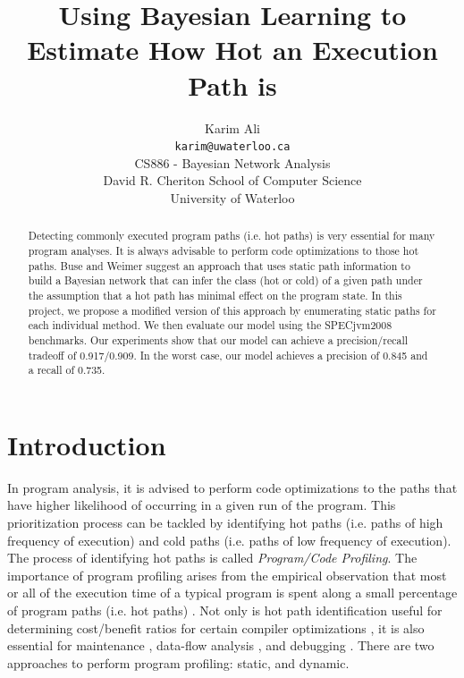\documentclass[10pt,twocolumn,letterpaper]{article}
\begin{document}
\title{Using Bayesian Learning to Estimate How Hot an Execution Path is}

\author{Karim Ali\\
{\tt\small karim@uwaterloo.ca}\\
CS886 - Bayesian Network Analysis\\
David R. Cheriton School of Computer Science\\
University of Waterloo\\}

\maketitle
\thispagestyle{empty}

\begin{abstract}
Detecting commonly executed program paths (i.e. hot paths) is very essential for many program analyses. It is always advisable to perform code optimizations
to those hot paths. Buse and Weimer \cite{buse2009road} suggest an approach that uses static path information to build a Bayesian network that can infer the
class (hot or cold) of a given path under the assumption that a hot path has minimal effect on the program state. In this project, we propose a modified version
of this approach by enumerating static paths for each individual method. We then evaluate our model using the SPECjvm2008 \cite{specjvm2008} benchmarks. Our
experiments show that our model can achieve a precision/recall tradeoff of 0.917/0.909. In the worst case, our model achieves a precision of 0.845 and a recall
of 0.735.
\end{abstract}

\section{Introduction}
\label{sec:intro}
In program analysis, it is advised to perform code optimizations to the paths that have higher likelihood of occurring in a given run of the program. This
prioritization process can be tackled by identifying hot paths (i.e. paths of high frequency of execution) and cold paths (i.e. paths of low frequency of
execution). The process of identifying hot paths is called \textit{Program/Code Profiling}. The importance of program profiling arises from the empirical
observation that most or all of the execution time of a typical program is spent along a small percentage of program paths (i.e. hot paths) \cite{buse2009road}.
Not only is hot path identification useful for determining cost/benefit ratios for certain compiler optimizations \cite{boogerd2008use}, it is also essential
for maintenance \cite{reps1997use}, data-flow analysis \cite{ammons1998improving}, and debugging \cite{chilimbi2009holmes}. There are two approaches to perform
program profiling: static, and dynamic.
\end{document}
